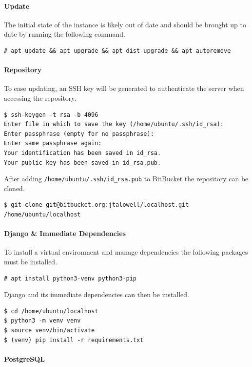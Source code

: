 \paragraph{Update}

The initial state of the instance is likely out of date and should be brought
up to date by running the following command.
\begin{lstlisting}
# apt update && apt upgrade && apt dist-upgrade && apt autoremove
\end{lstlisting}

\paragraph{Repository}

To ease updating, an SSH key will be generated to authenticate the server when
accessing the repository.
\begin{lstlisting}
$ ssh-keygen -t rsa -b 4096
Enter file in which to save the key (/home/ubuntu/.ssh/id_rsa):
Enter passphrase (empty for no passphrase):
Enter same passphrase again:
Your identification has been saved in id_rsa.
Your public key has been saved in id_rsa.pub.
\end{lstlisting}
After adding \lstinline{/home/ubuntu/.ssh/id_rsa.pub} to BitBucket the
repository can be cloned.
\begin{lstlisting}
$ git clone git@bitbucket.org:jtalowell/localhost.git /home/ubuntu/localhost
\end{lstlisting}

\paragraph{Django \& Immediate Dependencies}

To install a virtual environment and manage dependencies the following
packages must be installed.
\begin{lstlisting}
# apt install python3-venv python3-pip
\end{lstlisting}
Django and its immediate dependencies can then be installed.
\begin{lstlisting}
$ cd /home/ubuntu/localhost
$ python3 -m venv venv
$ source venv/bin/activate
$ (venv) pip install -r requirements.txt
\end{lstlisting}

\paragraph{PostgreSQL}


